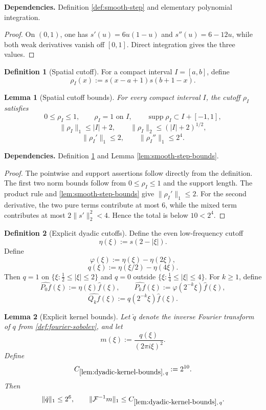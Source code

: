 \documentclass[11pt]{article}
\newtheorem{lemma}[lemma]{Lemma}
\theoremstyle{definition}
\newtheorem{definition}[definition]{Definition}
\theoremstyle{remark}
\newcommand{\supp}{\operatorname{supp}}
\newcommand{\1}{\mathbf 1}
\newcommand{\FT}[1]{\widehat{#1}}
\newcommand{\lpNorm}[2]{\lVert #1\rVert_{#2}}
\newcommand{\uses}[1]{\par\smallskip\noindent\textbf{Dependencies.} #1\par\smallskip}
\begin{document}
\uses{Definition \ref{def:smooth-step} and elementary polynomial integration.}

\begin{proof}
On $(0,1)$, one has $s'(u)=6u(1-u)$ and $s''(u)=6-12u$, while both weak derivatives vanish off $[0,1]$.  Direct integration gives the three values.
\end{proof}

\begin{definition}[Spatial cutoff]\label{def:spatial-cutoff}
For a compact interval $I=[a,b]$, define
\[
\rho_I(x):=s(x-a+1)s(b+1-x).
\]
\end{definition}

\begin{lemma}[Spatial cutoff bounds]\label{lem:spatial-cutoff-bounds}
For every compact interval $I$, the cutoff $\rho_I$ satisfies
\[
0\leq\rho_I\leq1,
\qquad
\rho_I=1\text{ on }I,
\qquad
\supp\rho_I\subset I+[-1,1],
\]
\[
\lpNorm{\rho_I}1\leq\lvert I\rvert+2,
\qquad
\lpNorm{\rho_I}2\leq(\lvert I\rvert+2)^{1/2},
\]
\[
\lpNorm{\rho_I'}1\leq2,
\qquad
\lpNorm{\rho_I''}1\leq2^4.
\]
\end{lemma}

\uses{Definition \ref{def:spatial-cutoff} and Lemma \ref{lem:smooth-step-bounds}.}

\begin{proof}
The pointwise and support assertions follow directly from the definition.  The first two norm bounds follow from $0\leq\rho_I\leq1$ and the support length.  The product rule and \cref{lem:smooth-step-bounds} give
$\lpNorm{\rho_I'}1\leq2$.  For the second derivative, the two pure terms contribute at most $6$, while the mixed term contributes at most
$2\lpNorm{s'}2^2<4$.  Hence the total is below $10<2^4$.
\end{proof}

\begin{definition}[Explicit dyadic cutoffs]\label{def:dyadic-cutoffs}
Define the even low-frequency cutoff
\[
\eta(\xi):=s(2-|\xi|).
\]
Define
\[
\varphi(\xi):=\eta(\xi)-\eta(2\xi),
\]
\[
q(\xi):=\eta(\xi/2)-\eta(4\xi).
\]
Then $q=1$ on $\{\xi:\tfrac12\leq|\xi|\leq2\}$ and
$q=0$ outside $\{\xi:\tfrac14\leq|\xi|\leq4\}$.
For $k\geq1$, define
\[
\FT{P_0f}(\xi):=\eta(\xi)\FT f(\xi),
\qquad
\FT{P_kf}(\xi):=\varphi(2^{-k}\xi)\FT f(\xi),
\]
\[
\FT{Q_kf}(\xi):=q(2^{-k}\xi)\FT f(\xi).
\]
\end{definition}

\begin{lemma}[Explicit kernel bounds]\label{lem:dyadic-kernel-bounds}
Let $\check q$ denote the inverse Fourier transform of $q$ from 
\cref{def:fourier-sobolev}, and let
\[
m(\xi):=\frac{q(\xi)}{(2\pi i\xi)^2}.
\]
Define
\[
C_{\ref{lem:dyadic-kernel-bounds},\,q}:=2^{10}.
\]
Then
\[
\lpNorm{\check q}1\leq2^6,
\qquad
\lpNorm{\mathcal F^{-1}m}1\leq
C_{\ref{lem:dyadic-kernel-bounds},\,q}.
\]
\end{lemma}
\end{document}
